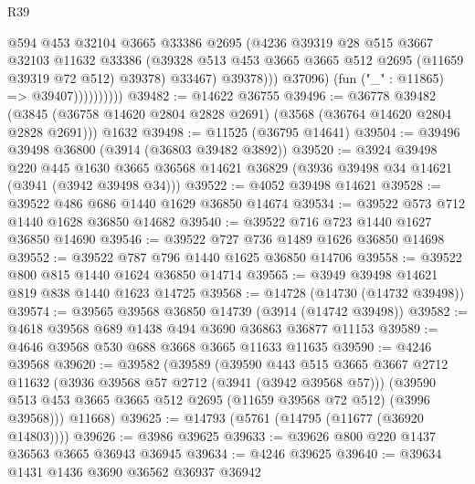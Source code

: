 \begin{lexlean}{R39}
\begin{coremodule}
                              @594
                              @453
                              @32104
                              @3665
                              @33386
                              @2695
                              (@4236
                                @39319
                                @28
                                @515
                                @3667
                                @32103
                                @11632
                                @33386
                                (@39328
                                  @513
                                  @453
                                  @3665
                                  @3665
                                  @512
                                  @2695
                                  (@11659 @39319 @72 @512)
                                  @39378)
                                @33467)
                              @39378)))
                        @37096)
                      (fun ("_" : @11865) => @39407))))))))))
@39482 := @14622 @36755
@39496 := @36778
    @39482
    (@3845 (@36758 @14620 @2804 @2828 @2691) (@3568 (@36764 @14620 @2804 @2828 @2691)))
    @1632
@39498 := @11525 (@36795 @14641)
@39504 := @39496 @39498 @36800 (@3914 (@36803 @39482 @3892))
@39520 := @3924
    @39498
    @220
    @445
    @1630
    @3665
    @36568
    @14621
    @36829
    (@3936 @39498 @34 @14621 (@3941 (@3942 @39498 @34)))
@39522 := @4052 @39498 @14621
@39528 := @39522 @486 @686 @1440 @1629 @36850 @14674
@39534 := @39522 @573 @712 @1440 @1628 @36850 @14682
@39540 := @39522 @716 @723 @1440 @1627 @36850 @14690
@39546 := @39522 @727 @736 @1489 @1626 @36850 @14698
@39552 := @39522 @787 @796 @1440 @1625 @36850 @14706
@39558 := @39522 @800 @815 @1440 @1624 @36850 @14714
@39565 := @3949 @39498 @14621 @819 @838 @1440 @1623 @14725
@39568 := @14728 (@14730 (@14732 @39498))
@39574 := @39565 @39568 @36850 @14739 (@3914 (@14742 @39498))
@39582 := @4618 @39568 @689 @1438 @494 @3690 @36863 @36877 @11153
@39589 := @4646 @39568 @530 @688 @3668 @3665 @11633 @11635
@39590 := @4246 @39568
@39620 := @39582
    (@39589
      (@39590
        @443
        @515
        @3665
        @3667
        @2712
        @11632
        (@3936 @39568 @57 @2712 (@3941 (@3942 @39568 @57)))
        (@39590 @513 @453 @3665 @3665 @512 @2695 (@11659 @39568 @72 @512) (@3996 @39568)))
      @11668)
@39625 := @14793 (@5761 (@14795 (@11677 (@36920 @14803))))
@39626 := @3986 @39625
@39633 := @39626 @800 @220 @1437 @36563 @3665 @36943 @36945
@39634 := @4246 @39625
@39640 := @39634 @1431 @1436 @3690 @36562 @36937 @36942

\end{coremodule}
\end{lexlean}
